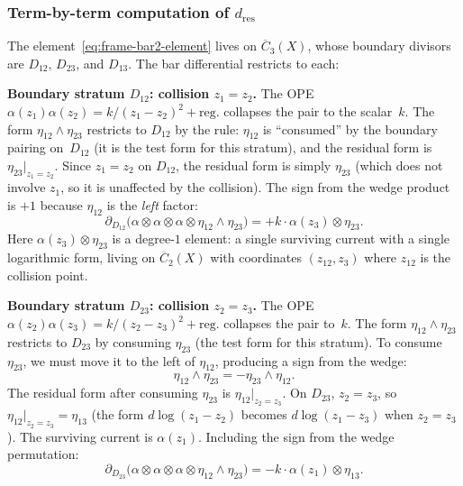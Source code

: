 \subsubsection*{Term-by-term computation of $d_{\mathrm{res}}$}

The element~\eqref{eq:frame-bar2-element} lives on
$\overline{C}_3(X)$, whose boundary divisors are $D_{12}$, $D_{23}$,
and $D_{13}$.  The bar differential restricts to each:

\medskip
\noindent\textbf{Boundary stratum $D_{12}$: collision $z_1 = z_2$.}
The OPE $\alpha(z_1)\alpha(z_2) = k/(z_1 - z_2)^2 + \mathrm{reg.}$
collapses the pair to the scalar~$k$.  The form
$\eta_{12} \wedge \eta_{23}$ restricts to $D_{12}$ by the rule:
$\eta_{12}$ is ``consumed'' by the boundary pairing
on~$D_{12}$ (it is the test form for this stratum), and the
residual form is $\eta_{23}|_{z_1 = z_2}$.  Since $z_1 = z_2$
on $D_{12}$, the residual form is simply $\eta_{23}$ (which
does not involve $z_1$, so it is unaffected by the collision).
The sign from the wedge product is $+1$ because $\eta_{12}$ is
the \emph{left} factor:
\begin{equation}\label{eq:frame-D12-contribution}
\partial_{D_{12}}\bigl(
  \alpha \otimes \alpha \otimes \alpha \otimes
  \eta_{12} \wedge \eta_{23}
\bigr)
= +k \cdot \alpha(z_3) \otimes \eta_{23}.
\end{equation}
Here $\alpha(z_3) \otimes \eta_{23}$ is a degree-$1$
element: a single surviving current with a single logarithmic
form, living on $\overline{C}_2(X)$ with coordinates $(z_{12}, z_3)$
where $z_{12}$ is the collision point.

\medskip
\noindent\textbf{Boundary stratum $D_{23}$: collision $z_2 = z_3$.}
The OPE $\alpha(z_2)\alpha(z_3) = k/(z_2 - z_3)^2 + \mathrm{reg.}$
collapses the pair to~$k$.  The form $\eta_{12} \wedge \eta_{23}$
restricts to $D_{23}$ by consuming $\eta_{23}$ (the test form
for this stratum).  To consume $\eta_{23}$, we must move it to
the left of $\eta_{12}$, producing a sign from the wedge:
\[
\eta_{12} \wedge \eta_{23} = -\eta_{23} \wedge \eta_{12}.
\]
The residual form after consuming $\eta_{23}$ is $\eta_{12}|_{z_2 = z_3}$.
On $D_{23}$, $z_2 = z_3$, so $\eta_{12}|_{z_2 = z_3} = \eta_{13}$
(the form $d\log(z_1 - z_2)$ becomes $d\log(z_1 - z_3)$
when $z_2 = z_3$).  The surviving current is $\alpha(z_1)$.
Including the sign from the wedge permutation:
\begin{equation}\label{eq:frame-D23-contribution}
\partial_{D_{23}}\bigl(
  \alpha \otimes \alpha \otimes \alpha \otimes
  \eta_{12} \wedge \eta_{23}
\bigr)
= -k \cdot \alpha(z_1) \otimes \eta_{13}.
\end{equation}

